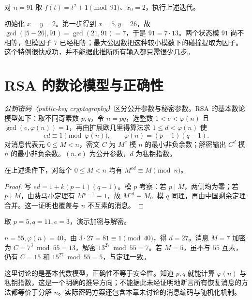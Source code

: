 \begin{example}[观察一次因数分解迭代]
对 $n=91$ 取 $f(t)=t^2+1\pmod{91}$、$x_0=2$，执行上述迭代。
\end{example}
\begin{solve}
初始化 $x=y=2$。第一步得到 $x=5,y=26$，故 $\gcd(|5-26|,91)=\gcd(21,91)=7$，于是 $91=7\cdot13$。两个状态模 $91$ 尚不相等，但模因子 $7$ 已经相等；最大公因数把这种较小模数下的碰撞提取为因子。这个特例很快成功，并不能据此推断所有输入都只需很少几步。
\end{solve}

\section{RSA 的数论模型与正确性}

\emph{公钥密码（public-key cryptography）}区分公开参数与秘密参数。RSA 的基本数论模型如下：取不同奇素数 $p,q$，令 $n=pq$，选整数 $1<e<\varphi(n)$ 且 $\gcd(e,\varphi(n))=1$，再由扩展欧几里得算法求 $1\le d<\varphi(n)$ 使
\[
 ed\equiv1\pmod{\varphi(n)},\qquad \varphi(n)=(p-1)(q-1).
\]
对消息代表元 $0\le M<n$，密文 $C$ 为 $M^e$ 模 $n$ 的最小非负余数；解密输出 $C^d$ 模 $n$ 的最小非负余数。$(n,e)$ 为公开参数，$d$ 为私钥指数。

\begin{proposition}
\label{prop:rsa-correctness}
在上述条件下，对每个 $0\le M<n$ 均有 $M^{ed}\equiv M\pmod n$。
\end{proposition}
\begin{proof}
写 $ed=1+k(p-1)(q-1)$。模 $p$ 考察：若 $p\mid M$，两侧均为零；若 $p\nmid M$，由费马小定理有 $M^{p-1}\equiv1$，故 $M^{ed}\equiv M$。模 $q$ 同理，再由中国剩余定理合并。这一证明也覆盖与 $n$ 不互素的消息。
\end{proof}

\begin{example}
取 $p=5,q=11,e=3$，演示加密与解密。
\end{example}
\begin{solve}
$n=55,\varphi(n)=40$，由 $3\cdot27=81\equiv1\pmod{40}$，得 $d=27$。消息 $M=7$ 加密为 $C=7^3\bmod55=13$，解密 $13^{27}\bmod55=7$。若 $M=5$，虽不与 $55$ 互素，仍有 $C=15$ 和 $15^{27}\bmod55=5$，与定理一致。
\end{solve}

这里讨论的是基本代数模型，正确性不等于安全性。知道 $p,q$ 就能计算 $\varphi(n)$ 与私钥指数，这是一个明确的推导方向；不能据此未经证明地断言所有恢复消息的方法都等价于分解 $n$。实际密码方案还包含本章未讨论的消息编码与随机化机制。

